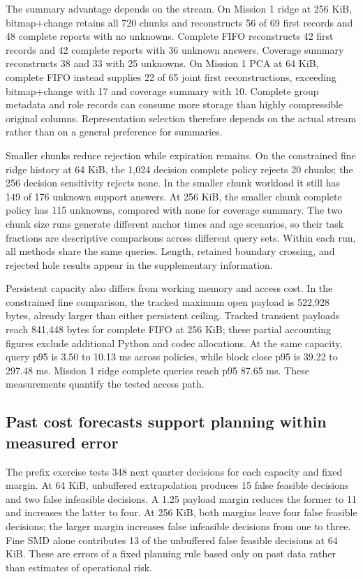 \documentclass[a4paper,fleqn]{cas-dc}
\begin{document}
The summary advantage depends on the stream. On Mission 1 ridge at 256 KiB, bitmap+change retains all 720 chunks and reconstructs 56 of 69 first records and 48 complete reports with no unknowns. Complete FIFO reconstructs 42 first records and 42 complete reports with 36 unknown answers. Coverage summary reconstructs 38 and 33 with 25 unknowns. On Mission 1 PCA at 64 KiB, complete FIFO instead supplies 22 of 65 joint first reconstructions, exceeding bitmap+change with 17 and coverage summary with 10. Complete group metadata and role records can consume more storage than highly compressible original columns. Representation selection therefore depends on the actual stream rather than on a general preference for summaries.

Smaller chunks reduce rejection while expiration remains. On the constrained fine ridge history at 64 KiB, the 1{,}024 decision complete policy rejects 20 chunks; the 256 decision sensitivity rejects none. In the smaller chunk workload it still has 149 of 176 unknown support answers. At 256 KiB, the smaller chunk complete policy has 115 unknowns, compared with none for coverage summary. The two chunk size runs generate different anchor times and age scenarios, so their task fractions are descriptive comparisons across different query sets. Within each run, all methods share the same queries. Length, retained boundary crossing, and rejected hole results appear in the supplementary information.

Persistent capacity also differs from working memory and access cost. In the constrained fine comparison, the tracked maximum open payload is 522{,}928 bytes, already larger than either persistent ceiling. Tracked transient payloads reach 841{,}448 bytes for complete FIFO at 256 KiB; these partial accounting figures exclude additional Python and codec allocations. At the same capacity, query p95 is 3.50 to 10.13 ms across policies, while block close p95 is 39.22 to 297.48 ms. Mission 1 ridge complete queries reach p95 87.65 ms. These measurements quantify the tested access path.

\subsection{Past cost forecasts support planning within measured error}

The prefix exercise tests 348 next quarter decisions for each capacity and fixed margin. At 64 KiB, unbuffered extrapolation produces 15 false feasible decisions and two false infeasible decisions. A 1.25 payload margin reduces the former to 11 and increases the latter to four. At 256 KiB, both margins leave four false feasible decisions; the larger margin increases false infeasible decisions from one to three. Fine SMD alone contributes 13 of the unbuffered false feasible decisions at 64 KiB. These are errors of a fixed planning rule based only on past data rather than estimates of operational risk.
\end{document}
